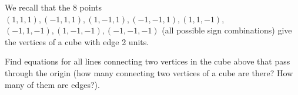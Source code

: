 \label{problemEquationsAllDiagonalsCubeContainingOrigin}
We recall that the 8 points $(1,1,1), (-1,1,1), (1,-1,1), (-1,-1,1), (1,1,-1)$, $(-1,1,-1), (1,-1,-1), (-1,-1,-1)$ (all possible sign combinations) give the vertices of a cube with edge 2 units.
 
Find equations for all lines connecting two vertices in the cube above that pass through the origin (how many connecting two vertices of a cube are there? How many of them are edges?).


